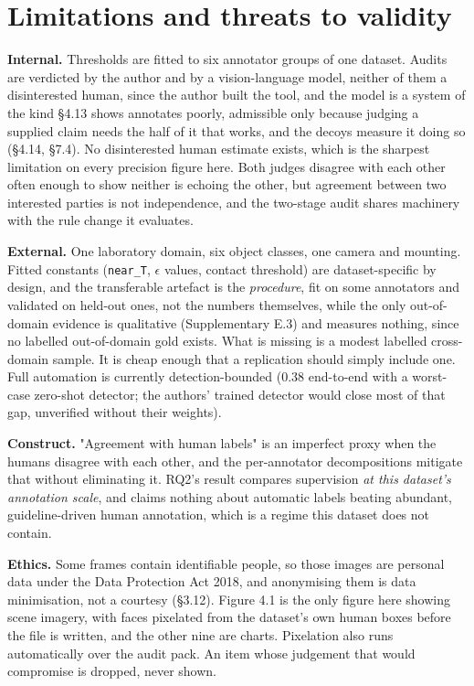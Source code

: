 \section{Limitations and threats to validity}

\textbf{Internal.} Thresholds are fitted to six annotator groups of one dataset. Audits are verdicted by the author and by a vision-language model, neither of them a disinterested human, since the author built the tool, and the model is a system of the kind \S{}4.13 shows annotates poorly, admissible only because judging a supplied claim needs the half of it that works, and the decoys measure it doing so (\S{}4.14, \S{}7.4). No disinterested human estimate exists, which is the sharpest limitation on every precision figure here. Both judges disagree with each other often enough to show neither is echoing the other, but agreement between two interested parties is not independence, and the two-stage audit shares machinery with the rule change it evaluates.

\textbf{External.} One laboratory domain, six object classes, one camera and mounting. Fitted constants (\texttt{near\_\allowbreak{}T}, $\epsilon$ values, contact threshold) are dataset-specific by design, and the transferable artefact is the \textit{procedure}, fit on some annotators and validated on held-out ones, not the numbers themselves, while the only out-of-domain evidence is qualitative (Supplementary E.3) and measures nothing, since no labelled out-of-domain gold exists. What is missing is a modest labelled cross-domain sample. It is cheap enough that a replication should simply include one. Full automation is currently detection-bounded (0.38 end-to-end with a worst-case zero-shot detector; the authors' trained detector would close most of that gap, unverified without their weights).

\textbf{Construct.} "Agreement with human labels" is an imperfect proxy when the humans disagree with each other, and the per-annotator decompositions mitigate that without eliminating it. RQ2's result compares supervision \textit{at this dataset's annotation scale}, and claims nothing about automatic labels beating abundant, guideline-driven human annotation, which is a regime this dataset does not contain.

\textbf{Ethics.} Some frames contain identifiable people, so those images are personal data under the Data Protection Act 2018, and anonymising them is data minimisation, not a courtesy (\S{}3.12). Figure 4.1 is the only figure here showing scene imagery, with faces pixelated from the dataset's own human boxes before the file is written, and the other nine are charts. Pixelation also runs automatically over the audit pack. An item whose judgement that would compromise is dropped, never shown.

